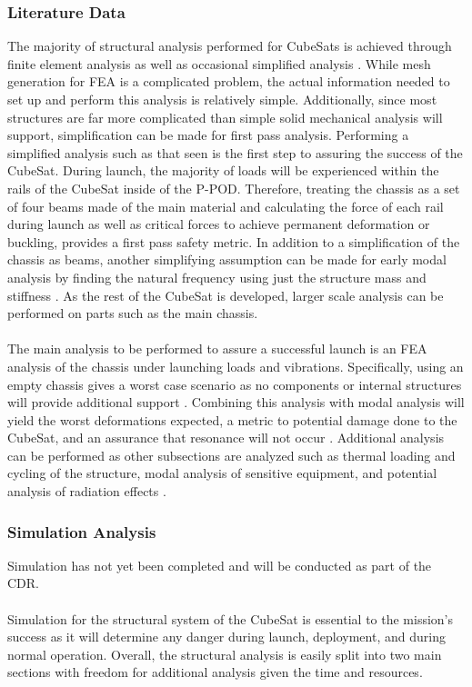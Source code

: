 \subsubsection{Literature Data}
The majority of structural analysis performed for CubeSats is achieved through finite element analysis \cite{FEA1, FEA3, FEA4, FEA5} as well as occasional simplified analysis \cite{FEA2}. While mesh generation for FEA is a complicated problem, the actual information needed to set up and perform this analysis is relatively simple. Additionally, since most structures are far more complicated than simple solid mechanical analysis will support, simplification can be made for first pass analysis. Performing a simplified analysis such as that seen \cite{FEA2} is the first step to assuring the success of the CubeSat. During launch, the majority of loads will be experienced within the rails of the CubeSat inside of the P-POD. Therefore, treating the chassis as a set of four beams made of the main material and calculating the force of each rail during launch as well as critical forces to achieve permanent deformation or buckling, provides a first pass safety metric. In addition to a simplification of the chassis as beams, another simplifying assumption can be made for early modal analysis by finding the natural frequency using just the structure mass and stiffness \cite{FEA5}. As the rest of the CubeSat is developed, larger scale analysis can be performed on parts such as the main chassis.
\\
\\
The main analysis to be performed to assure a successful launch is an FEA analysis of the chassis under launching loads and vibrations. Specifically, using an empty chassis gives a worst case scenario as no components or internal structures will provide additional support \cite{FEA5}. Combining this analysis with modal analysis will yield the worst deformations expected, a metric to potential damage done to the CubeSat, and an assurance that resonance will not occur \cite{FEA1, FEA5}. Additional analysis can be performed as other subsections are analyzed such as thermal loading and cycling of the structure, modal analysis of sensitive equipment, and potential analysis of radiation effects \cite{FEA5, FEA6, FEA7, SCRP}.
\subsubsection{Simulation Analysis}
Simulation has not yet been completed and will be conducted as part of the CDR.
\\
\\
Simulation for the structural system of the CubeSat is essential to the mission's success as it will determine any danger during launch, deployment, and during normal operation. Overall, the structural analysis is easily split into two main sections with freedom for additional analysis given the time and resources.
